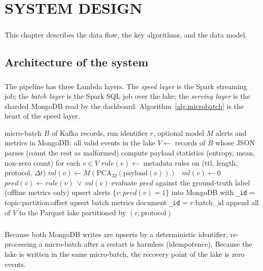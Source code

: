\chapter{SYSTEM DESIGN}

\paragraph{}
This chapter describes the data flow, the key algorithms, and the data model.

\section{Architecture of the system}
\paragraph{}
The pipeline has three Lambda layers. The \emph{speed layer} is the Spark streaming job; the \emph{batch layer} is the Spark SQL job over the lake; the \emph{serving layer} is the sharded MongoDB read by the dashboard. Algorithm~\ref{alg:microbatch} is the heart of the speed layer.

\begin{algorithm}[H]
\caption{Processing one micro-batch (dual write)} \label{alg:microbatch}
\begin{algorithmic}[1]
\Require micro-batch $B$ of Kafka records, run identifier $r$, optional model $M$
\Ensure alerts and metrics in MongoDB; all valid events in the lake
\State $V \gets$ records of $B$ whose JSON parses (count the rest as malformed)
\State compute payload statistics (entropy, mean, non-zero count) for each $v \in V$
  \State $rule(v) \gets$ metadata rules on (ttl, length, protocol, $\Delta t$)
   $ml(v) \gets M(\text{PCA}_{32}(\text{payload}(v)))$ \Else\ $ml(v) \gets 0$ \EndIf
  \State $pred(v) \gets rule(v)\ \lor\ ml(v)$ 
\EndFor
\State evaluate $pred$ against the ground-truth label (offline metrics only)
\State upsert alerts $\{v : pred(v)=1\}$ into MongoDB with \texttt{\_id} = topic:partition:offset
\State upsert batch metrics document \texttt{\_id} = $r$:batch\_id
\State append all of $V$ to the Parquet lake partitioned by $(r, \text{protocol})$ 
\end{algorithmic}
\end{algorithm}

\paragraph{}
Because both MongoDB writes are upserts by a deterministic identifier, re-processing a micro-batch after a restart is harmless (idempotence). Because the lake is written in the same micro-batch, the recovery point of the lake is zero events.

